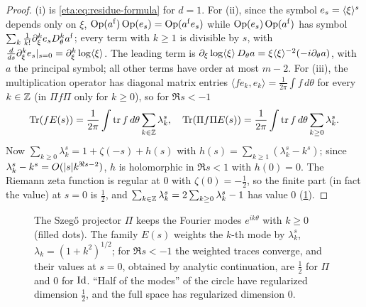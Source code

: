 \begin{proof} (i) is \eqref{eta:eq:residue-formula} for $d=1$. For (ii), since the
symbol $e_s=\langle \xi\rangle^s$ depends only on $\xi$, $\operatorname{Op}(a^{\mathrm f})\operatorname{Op}(e_s)=\operatorname{Op}(a^{\mathrm f}e_s)$
while $\operatorname{Op}(e_s)\operatorname{Op}(a^{\mathrm f})$ has symbol
$\sum_k\frac1{k!}\partial_\xi^ke_sD_\theta^ka^{\mathrm f}$; every term with
$k\ge1$ is divisible by $s$, with $\frac{d}{ds}\partial_\xi^ke_s|_{s=0}=\partial_\xi^k\log\langle \xi\rangle$.
The leading term is $\partial_\xi\log\langle \xi\rangle\,D_\theta a=\xi\langle \xi\rangle^{-2}(-i\partial_\theta a)$, with
$a$ the principal symbol; all other terms have order at most $m-2$.
For (iii), the multiplication operator has diagonal matrix entries
$\langle fe_k,e_k\rangle=\frac1{2\pi}\int f\,d\theta$ for every $k\in\mathbb{Z}$ (in
$\Pi f\Pi$ only for $k\ge0$), so for $\Re s<-1$
\[
\operatorname{Tr}(fE(s))=\frac1{2\pi}\int\operatorname{tr} f\,d\theta\sum_{k\in\mathbb{Z}}\lambda_k^s,\quad
\operatorname{Tr}(\Pi f\Pi E(s))=\frac1{2\pi}\int\operatorname{tr} f\,d\theta\sum_{k\ge0}\lambda_k^s.
\]
Now $\sum_{k\ge0}\lambda_k^s=1+\zeta(-s)+h(s)$ with
$h(s)=\sum_{k\ge1}(\lambda_k^s-k^s)$; since $\lambda_k^s-k^s=O(\lvert s\rvert k^{\Re s-2})$,
$h$ is holomorphic in $\Re s<1$ with $h(0)=0$. The Riemann zeta function is regular
at $0$ with $\zeta(0)=-\frac12$, so the finite part (in fact the value) at $s=0$ is
$\frac12$, and $\sum_{k\in\mathbb{Z}}\lambda_k^s=2\sum_{k\ge0}\lambda_k^s-1$ has value $0$
(\cref{eta:fig:szego}).
\end{proof}

\begin{figure}[ht]
\centering
{}
\caption[The regularized trace on the circle]{The Szeg\H{o} projector $\Pi$ keeps the
Fourier modes $e^{ik\theta}$ with $k\ge0$ (filled dots). The family $E(s)$ weights
the $k$-th mode by $\lambda_k^s$, $\lambda_k=(1+k^2)^{1/2}$; for $\Re s<-1$ the weighted
traces converge, and their values at $s=0$, obtained by analytic continuation, are
$\frac12$ for $\Pi$ and $0$ for $\operatorname{Id}$. ``Half of the modes'' of the circle have
regularized dimension $\frac12$, and the full space has regularized dimension $0$.}
\label{eta:fig:szego}
\end{figure}

